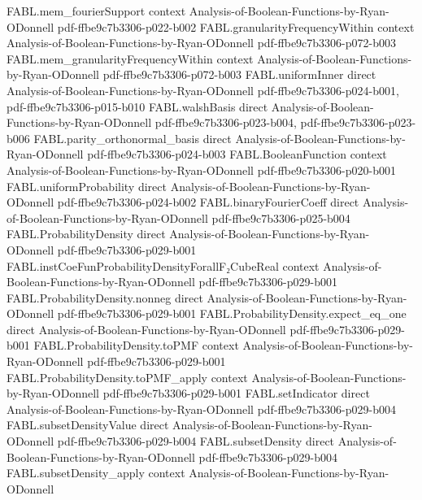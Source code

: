 \begin{theorem}
\proofstep
  {FABL.mem_fourierSupport}
  {context}
  {Analysis-of-Boolean-Functions-by-Ryan-ODonnell}
  {pdf-ffbe9c7b3306-p022-b002}
\proofstep
  {FABL.granularityFrequencyWithin}
  {context}
  {Analysis-of-Boolean-Functions-by-Ryan-ODonnell}
  {pdf-ffbe9c7b3306-p072-b003}
\proofstep
  {FABL.mem_granularityFrequencyWithin}
  {context}
  {Analysis-of-Boolean-Functions-by-Ryan-ODonnell}
  {pdf-ffbe9c7b3306-p072-b003}
\proofstep
  {FABL.uniformInner}
  {direct}
  {Analysis-of-Boolean-Functions-by-Ryan-ODonnell}
  {pdf-ffbe9c7b3306-p024-b001,
    pdf-ffbe9c7b3306-p015-b010}
\proofstep
  {FABL.walshBasis}
  {direct}
  {Analysis-of-Boolean-Functions-by-Ryan-ODonnell}
  {pdf-ffbe9c7b3306-p023-b004,
    pdf-ffbe9c7b3306-p023-b006}
\proofstep
  {FABL.parity_orthonormal_basis}
  {direct}
  {Analysis-of-Boolean-Functions-by-Ryan-ODonnell}
  {pdf-ffbe9c7b3306-p024-b003}
\proofstep
  {FABL.BooleanFunction}
  {context}
  {Analysis-of-Boolean-Functions-by-Ryan-ODonnell}
  {pdf-ffbe9c7b3306-p020-b001}
\proofstep
  {FABL.uniformProbability}
  {direct}
  {Analysis-of-Boolean-Functions-by-Ryan-ODonnell}
  {pdf-ffbe9c7b3306-p024-b002}
\proofstep
  {FABL.binaryFourierCoeff}
  {direct}
  {Analysis-of-Boolean-Functions-by-Ryan-ODonnell}
  {pdf-ffbe9c7b3306-p025-b004}
\proofstep
  {FABL.ProbabilityDensity}
  {direct}
  {Analysis-of-Boolean-Functions-by-Ryan-ODonnell}
  {pdf-ffbe9c7b3306-p029-b001}
\proofstep
  {FABL.instCoeFunProbabilityDensityForallF₂CubeReal}
  {context}
  {Analysis-of-Boolean-Functions-by-Ryan-ODonnell}
  {pdf-ffbe9c7b3306-p029-b001}
\proofstep
  {FABL.ProbabilityDensity.nonneg}
  {direct}
  {Analysis-of-Boolean-Functions-by-Ryan-ODonnell}
  {pdf-ffbe9c7b3306-p029-b001}
\proofstep
  {FABL.ProbabilityDensity.expect_eq_one}
  {direct}
  {Analysis-of-Boolean-Functions-by-Ryan-ODonnell}
  {pdf-ffbe9c7b3306-p029-b001}
\proofstep
  {FABL.ProbabilityDensity.toPMF}
  {context}
  {Analysis-of-Boolean-Functions-by-Ryan-ODonnell}
  {pdf-ffbe9c7b3306-p029-b001}
\proofstep
  {FABL.ProbabilityDensity.toPMF_apply}
  {context}
  {Analysis-of-Boolean-Functions-by-Ryan-ODonnell}
  {pdf-ffbe9c7b3306-p029-b001}
\proofstep
  {FABL.setIndicator}
  {direct}
  {Analysis-of-Boolean-Functions-by-Ryan-ODonnell}
  {pdf-ffbe9c7b3306-p029-b004}
\proofstep
  {FABL.subsetDensityValue}
  {direct}
  {Analysis-of-Boolean-Functions-by-Ryan-ODonnell}
  {pdf-ffbe9c7b3306-p029-b004}
\proofstep
  {FABL.subsetDensity}
  {direct}
  {Analysis-of-Boolean-Functions-by-Ryan-ODonnell}
  {pdf-ffbe9c7b3306-p029-b004}
\proofstep
  {FABL.subsetDensity_apply}
  {context}
  {Analysis-of-Boolean-Functions-by-Ryan-ODonnell}

\end{theorem}

